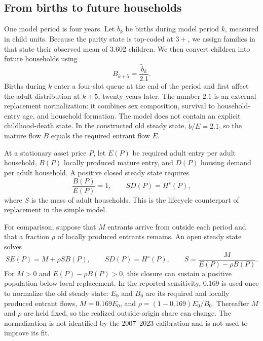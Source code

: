 \documentclass[11pt]{article}
\theoremstyle{definition}
\newcommand{\1}{\mathbf 1}
\begin{document}
\subsection{From births to future households}

One model period is four years. Let \(\widetilde b_k\) be births during model
period \(k\), measured in child units. Because the parity state is top-coded at
\(3+\), we assign families in that state their observed mean of \(3.602\)
children. We then convert children into future households using
\begin{equation}
 B_{k+5}=\frac{\widetilde b_k}{2.1}.
 \label{eq:birth_entry_queue}
\end{equation}
Births during \(k\) enter a four-slot queue at the end of the period and first
affect the adult distribution at \(k+5\), twenty years later. The number
\(2.1\) is an external replacement normalization: it combines sex composition,
survival to household-entry age, and household formation. The model does not
contain an explicit childhood-death state. In the constructed old steady state,
\(\widetilde b/E=2.1\), so the mature flow \(B\) equals the required entrant
flow \(E\).

At a stationary asset price \(P\), let \(E(P)\) be required adult entry per
adult household, \(B(P)\) locally produced mature entry, and \(D(P)\) housing
demand per adult household. A positive closed steady state requires
\begin{equation}
 \frac{B(P)}{E(P)}=1,
 \qquad
 S D(P)=H^s(P),
 \label{eq:closed_stationary_conditions}
\end{equation}
where \(S\) is the mass of adult households. This is the lifecycle counterpart
of replacement in the simple model.

For comparison, suppose that \(M\) entrants arrive from outside each period
and that a fraction \(\rho\) of locally produced entrants remains. An open
steady state solves
\begin{equation}
 S E(P)=M+\rho S B(P),
 \qquad
 S D(P)=H^s(P),
 \qquad
 S=\frac{M}{E(P)-\rho B(P)}.
 \label{eq:minimal_stationary_wrapper}
\end{equation}
For \(M>0\) and \(E(P)-\rho B(P)>0\), this closure can sustain a positive
population below local replacement. In the reported sensitivity, \(0.169\) is
used once to normalize the old steady state: \(E_0\) and \(B_0\) are its required
and locally produced entrant flows, \(M=0.169E_0\), and
\(\rho=(1-0.169)E_0/B_0\). Thereafter \(M\) and \(\rho\) are held fixed, so the
realized outside-origin share can change. The normalization is not identified
by the 2007--2023 calibration and is not used to improve its fit.
\end{document}
